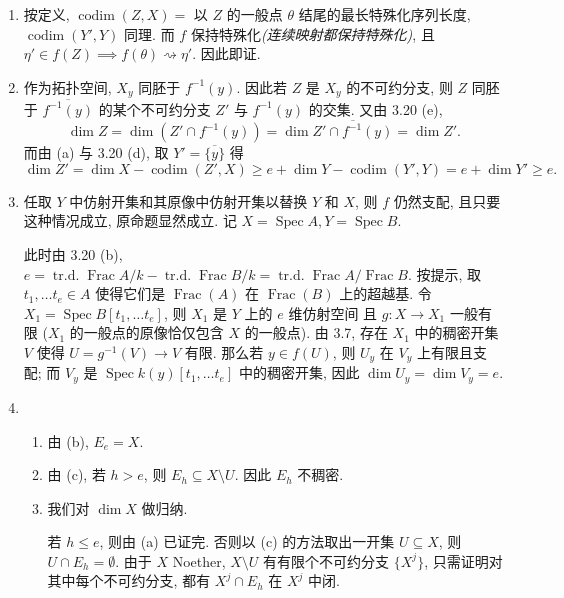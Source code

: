 \documentclass{article}
\theoremstyle{exercise}
\newenvironment{proofc}{\proof}{\endproof}
\def\spto{\rightsquigarrow}
\def\Spec{\operatorname{Spec}}
\def\dim{\operatorname{dim}}
\def\codim{\operatorname{codim}}
\def\Frac{\operatorname{Frac}}
\def\trd{\operatorname{tr.d.}}
\def\leq{\leqslant}
\def\geq{\geqslant}
\begin{document}
\begin{proofc}
  \begin{enumerate}[label={(\alph*)}]
    \item 按定义, $\codim(Z, X) =$ 以 $Z$ 的一般点 $\theta$ 结尾的最长特殊化序列长度,
          $\codim(Y', Y)$ 同理. 而 $f$ 保持特殊化\emph{(连续映射都保持特殊化)},
          且 $\eta' \in f(Z) \implies f(\theta) \spto \eta'$. 因此即证.
    \item 作为拓扑空间, $X_y$ 同胚于 $f^{-1}(y)$.
          因此若 $Z$ 是 $X_y$ 的不可约分支,
          则 $Z$ 同胚于 $\overline{f^{-1}(y)}$ 的某个不可约分支 $Z'$
          与 $f^{-1}(y)$ 的交集. 又由 3.20 (e),
          \[
          \dim Z = \dim (Z' \cap f^{-1}(y))
          = \dim \overline{Z' \cap f^{-1}(y)} = \dim Z'.
          \]
          而由 (a) 与 3.20 (d), 取 $Y' = \overline{\{y\}}$ 得
          \[
          \dim Z' = \dim X - \codim(Z', X) \geq e + \dim Y - \codim(Y', Y)
          = e + \dim Y' \geq e.
          \]
    \item 任取 $Y$ 中仿射开集和其原像中仿射开集以替换 $Y$ 和 $X$,
          则 $f$ 仍然支配, 且只要这种情况成立, 原命题显然成立.
          记 $X = \Spec A, Y = \Spec B$.

          此时由 3.20 (b),
          $e = \trd \Frac A / k - \trd \Frac B / k = \trd \Frac A / \Frac B$.
          按提示, 取 $t_1, \dots t_e \in A$ 使得它们是 $\Frac(A)$ 在 $\Frac(B)$
          上的超越基.
          令 $X_1 = \Spec B[t_1, \dots t_e]$, 则 $X_1$ 是 $Y$ 上的 $e$ 维仿射空间
          且 $g \colon X \to X_1$ 一般有限 ($X_1$ 的一般点的原像恰仅包含 $X$ 的一般点).
          由 3.7, 存在 $X_1$ 中的稠密开集 $V$ 使得 $U = g^{-1}(V) \to V$ 有限.
          那么若 $y \in f(U)$, 则 $U_y$ 在 $V_y$ 上有限且支配;
          而 $V_y$ 是 $\Spec k(y)[t_1, \dots t_e]$ 中的稠密开集,
          因此 $\dim U_y = \dim V_y = e$.
    \item \begin{enumerate}[label={\arabic*.}]
            \item 由 (b), $E_e = X$.
            \item 由 (c), 若 $h > e$, 则 $E_h \subseteq X \setminus U$.
                  因此 $E_h$ 不稠密.
            \item 我们对 $\dim X$ 做归纳.

                  若 $h \leq e$, 则由 (a) 已证完.
                  否则以 (c) 的方法取出一开集 $U \subseteq X$,
                  则 $U \cap E_h = \emptyset$.
                  由于 $X$ Noether, $X \setminus U$
                  有有限个不可约分支 $\{X^j\}$, 只需证明对其中每个不可约分支,
                  都有 $X^j \cap E_h$ 在 $X^j$ 中闭.


\end{enumerate}
\end{enumerate}
\end{proofc}
\end{document}
